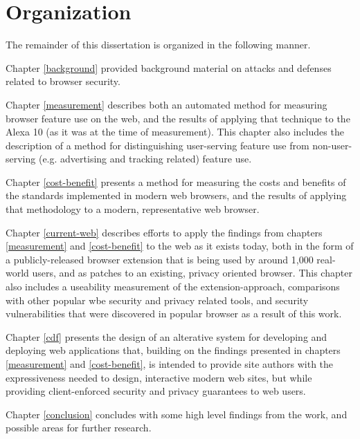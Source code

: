 \section{Organization}
\label{intro:organization}

The remainder of this dissertation is organized in the following manner.

Chapter \ref{background} provided background material on attacks and defenses
related to browser security.

Chapter \ref{measurement} describes both an automated method for measuring
browser feature use on the web, and the results of applying that technique
to the Alexa 10 (as it was at the time of measurement).  This chapter
also includes the description of a method for distinguishing user-serving
feature use from non-user-serving (e.g. advertising and tracking related)
feature use.

Chapter \ref{cost-benefit} presents a method for measuring the costs and
benefits of the \WAPI standards implemented in modern web browsers, and
the results of applying that methodology to a modern, representative web
browser.

Chapter \ref{current-web} describes efforts to apply the findings from
chapters \ref{measurement} and \ref{cost-benefit} to the web as it exists today,
both in the form of a publicly-released browser extension that is being
used by around 1,000 real-world users, and as patches to an existing, privacy
oriented browser.  This chapter also includes a useability measurement of the
extension-approach, comparisons with other popular wbe security and privacy
related tools, and security vulnerabilities that were discovered in popular
browser as a result of this work.

Chapter \ref{cdf} presents the design of an alterative system for developing
and deploying web applications that, building on the findings presented in
chapters \ref{measurement} and \ref{cost-benefit}, is intended to provide
site authors with the expressiveness needed to design, interactive modern web
sites, but while providing client-enforced security and privacy guarantees to
web users.

Chapter \ref{conclusion} concludes with some high level findings from the
work, and possible areas for further research.